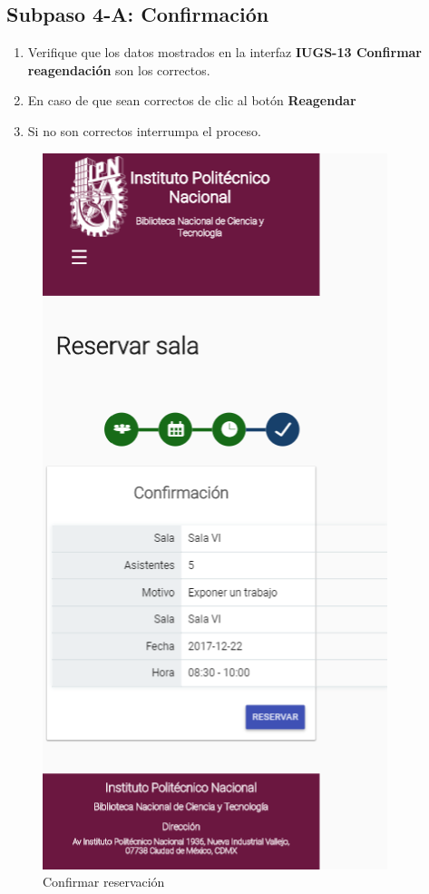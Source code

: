 \subsection{Subpaso 4-A: Confirmación}
\begin{enumerate}
	\item Verifique que los datos mostrados en la interfaz \textbf{IUGS-13 Confirmar reagendación} son los correctos.
	\item En caso de que sean correctos de clic al botón \textbf{Reagendar}
	\item Si no son correctos interrumpa el proceso.
\end{enumerate}

\begin{figure}[hbtp]	
		\includegraphics[scale=0.3]{images/InterfazMovil/IUGS02_reservarConfirmar.png}
		\caption{Confirmar reservación}
		
\end{figure}